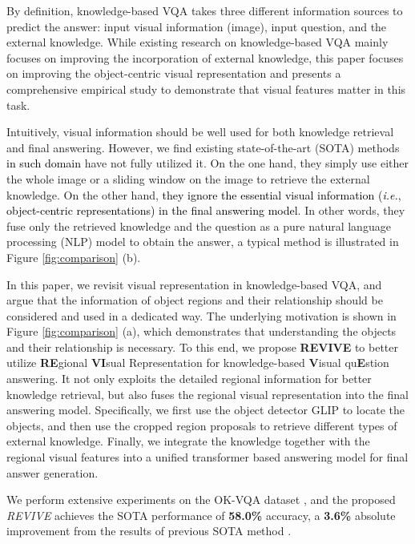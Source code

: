 \documentclass{article}
\begin{document}
By definition, knowledge-based VQA takes three different information sources to predict the answer: input visual information (image), input question, and the external knowledge. While existing research on knowledge-based VQA mainly focuses on improving the incorporation of external knowledge, this paper focuses on improving the object-centric visual representation and presents a comprehensive empirical study to demonstrate that visual features matter in this task.

Intuitively, visual information should be well used for both knowledge retrieval and final answering. However, we find existing state-of-the-art (SOTA) methods \cite{yang2021empirical,gui2021kat} \textcolor{black}{in such domain} have not fully utilized it. On the one hand, they simply use either the whole image or a sliding window on the image to retrieve the external knowledge. On the other hand, \textcolor{black}{they ignore the essential visual information (\textit{i.e.}, object-centric representations) in the final answering model}. In other words, they fuse only the retrieved knowledge and the question as a pure natural language processing (NLP) model to obtain the answer, a typical method \cite{gui2021kat} is illustrated in Figure \ref{fig:comparison} (b). 

In this paper, we revisit visual representation in knowledge-based VQA, and argue that the information of object regions and their relationship should be considered and used in a dedicated way. The underlying motivation is shown in Figure \ref{fig:comparison} (a), which demonstrates that understanding the objects and their relationship is necessary.  To this end, we propose \textbf{REVIVE} to better utilize \textbf{RE}gional \textbf{VI}sual Representation for knowledge-based \textbf{V}isual qu\textbf{E}stion answering. It not only exploits the detailed regional information for better knowledge retrieval, but also fuses the regional visual representation into the final answering model. Specifically, we first use the object detector GLIP \cite{li2021grounded} to locate the objects, and then use the cropped region proposals to retrieve different types of external knowledge. Finally, we integrate the knowledge together with the regional visual features into a unified transformer based answering model for final answer generation. 

We perform extensive experiments on the OK-VQA dataset \cite{marino2019ok}, and the proposed \emph{REVIVE} achieves the SOTA performance of \textbf{58.0\%} accuracy, a \textbf{3.6\%} absolute improvement from the results of previous SOTA method \cite{gui2021kat}. 
\end{document}
